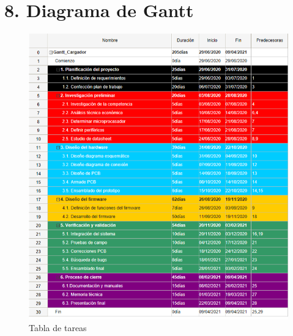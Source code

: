 \documentclass[11pt]{charter}
\begin{document}



\section{8. Diagrama de Gantt}
\label{sec:gantt}

\begin{figure}[H]
\centering 
\includegraphics[width=1\textwidth]{./Figuras/Gantt_tabla.png}
\caption{Tabla de tareas}
\label{fig:Tabla Gantt}
\end{figure}
\end{document}
